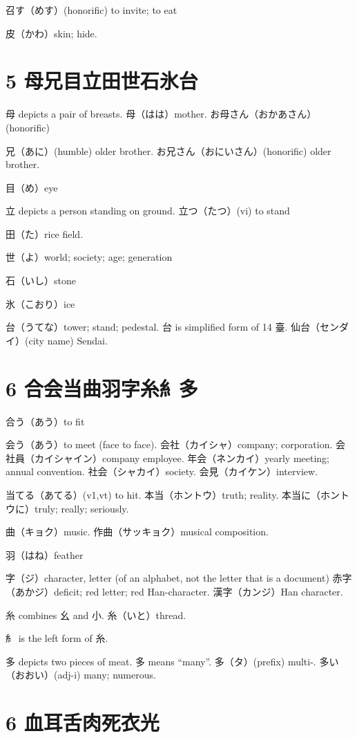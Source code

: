 召す（めす）(honorific) to invite; to eat

皮（かわ）skin; hide.

\section{5 母兄目立田世石氷台}

母 depicts a pair of breasts.
母（はは）mother.
お母さん（おかあさん）(honorific)

兄（あに）(humble) older brother.
お兄さん（おにいさん）(honorific) older brother.

目（め）eye

立 depicts a person standing on ground.
立つ（たつ）(vi) to stand

田（た）rice field.

世（よ）world; society; age; generation

石（いし）stone

氷（こおり）ice

台（うてな）tower; stand; pedestal.
台 is simplified form of 14 臺.
仙台（センダイ）(city name) Sendai.

\section{6 合会当曲羽字糸糹多}

合う（あう）to fit

会う（あう）to meet (face to face).
会社（カイシャ）company; corporation.
会社員（カイシャイン）company employee.
年会（ネンカイ）yearly meeting; annual convention.
社会（シャカイ）society.
会見（カイケン）interview.

当てる（あてる）(v1,vt) to hit.
本当（ホントウ）truth; reality.
本当に（ホントウに）truly; really; seriously.

曲（キョク）music.
作曲（サッキョク）musical composition.

羽（はね）feather

字（ジ）character, letter (of an alphabet, not the letter that is a document)
赤字（あかジ）deficit; red letter; red Han-character.
漢字（カンジ）Han character.

糸 combines 幺 and 小.
糸（いと）thread.

糹 is the left form of 糸.

多 depicts two pieces of meat.
多 means ``many''.
多（タ）(prefix) multi-.
多い（おおい）(adj-i) many; numerous.

\section{6 血耳舌肉死衣光}

